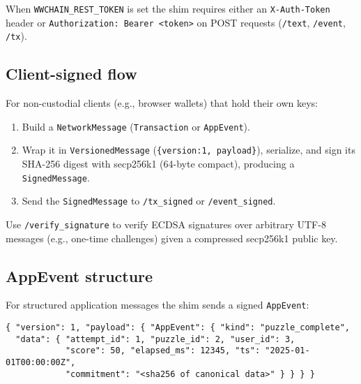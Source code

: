 When \texttt{WWCHAIN\_REST\_TOKEN} is set the shim requires either an \texttt{X-Auth-Token} header or \texttt{Authorization: Bearer <token>} on POST requests (\texttt{/text}, \texttt{/event}, \texttt{/tx}).

\subsection{Client-signed flow}
For non-custodial clients (e.g., browser wallets) that hold their own keys:
\begin{enumerate}
\item Build a \texttt{NetworkMessage} (\texttt{Transaction} or \texttt{AppEvent}).
\item Wrap it in \texttt{VersionedMessage} (\texttt{\{version:1, payload\}}), serialize, and sign its SHA-256 digest with secp256k1 (64-byte compact), producing a \texttt{SignedMessage}.
\item Send the \texttt{SignedMessage} to \texttt{/tx\_signed} or \texttt{/event\_signed}.
\end{enumerate}
Use \texttt{/verify\_signature} to verify ECDSA signatures over arbitrary UTF-8 messages (e.g., one-time challenges) given a compressed secp256k1 public key.

\subsection{AppEvent structure}
For structured application messages the shim sends a signed \texttt{AppEvent}:
\begin{verbatim}
{ "version": 1, "payload": { "AppEvent": { "kind": "puzzle_complete",
  "data": { "attempt_id": 1, "puzzle_id": 2, "user_id": 3,
            "score": 50, "elapsed_ms": 12345, "ts": "2025-01-01T00:00:00Z",
            "commitment": "<sha256 of canonical data>" } } } }
\end{verbatim}

